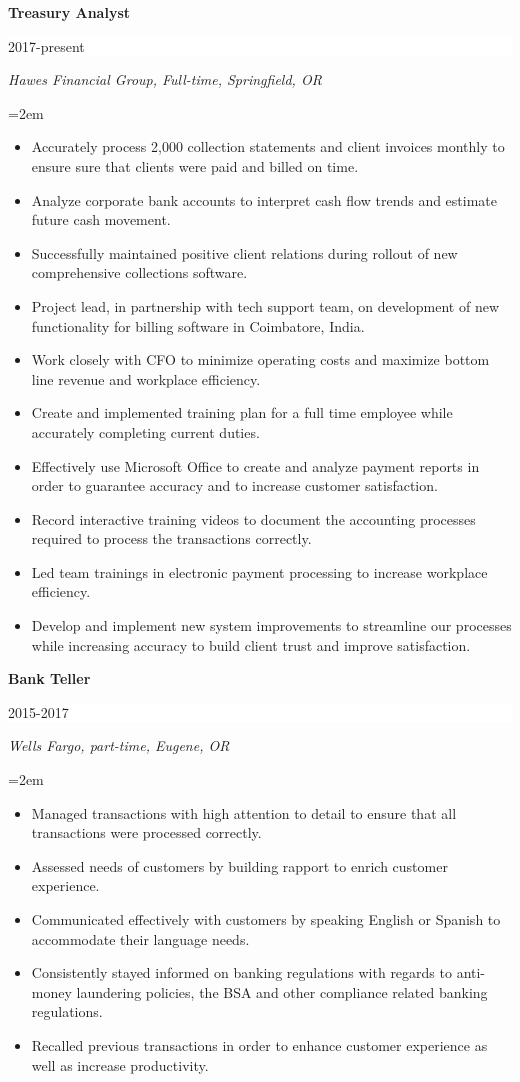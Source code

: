 \documentclass[paper=a4,fontsize=10pt]{scrartcl} %
\newcommand{\sepspace}{\vspace*{1em}}		%
\newcommand{\EducationEntry}[4]{
		\noindent \textbf{#1} \hfill      %
		\colorbox{White}{%
			\parbox{6em}{%
			\hfill\color{Black}#2}} \par  %
		\noindent \textit{#3} \par        %
		\noindent\hangindent=2em\hangafter=0 \small #4 %
		\normalsize \par}
\begin{document}
\EducationEntry{Treasury Analyst}{2017-present}{Hawes Financial Group, Full-time, Springfield, OR}
{
\begin{itemize}[leftmargin=+.2in]
\item Accurately process 2,000 collection statements and client invoices monthly to ensure sure that clients were paid and billed on time.
\item Analyze corporate bank accounts to interpret cash flow trends and estimate future cash movement.
\item Successfully maintained positive client relations during rollout of new comprehensive collections software.
\item Project lead, in partnership with tech support team, on development of new functionality for billing software in Coimbatore, India.
\item Work closely with CFO to minimize operating costs and maximize bottom line revenue and workplace efficiency.
\item Create and implemented training plan for a full time employee while accurately completing current duties.
\item Effectively use Microsoft Office to create and analyze payment reports in order to guarantee accuracy and to increase customer satisfaction.
\item Record interactive training videos to document the accounting processes required to process the transactions correctly.
\item Led team trainings in electronic payment processing to increase workplace efficiency.
\item Develop and implement new system improvements to streamline our processes while increasing accuracy to build client trust and improve satisfaction.
\end{itemize}
}

\sepspace

\EducationEntry{Bank Teller}{2015-2017}{Wells Fargo, part-time,  Eugene, OR}
{
\begin{itemize}[leftmargin=+.2in]
\item Managed transactions with high attention to detail to ensure that all transactions were processed correctly.
\item Assessed needs of customers by building rapport to enrich customer experience.
\item Communicated effectively with customers by speaking English or Spanish to accommodate their language needs.
\item Consistently stayed informed on banking regulations with regards to anti-money laundering policies, the BSA and other compliance related banking regulations.
\item Recalled previous transactions in order to enhance customer experience as well as increase productivity.
\end{itemize}
}
\end{document}

